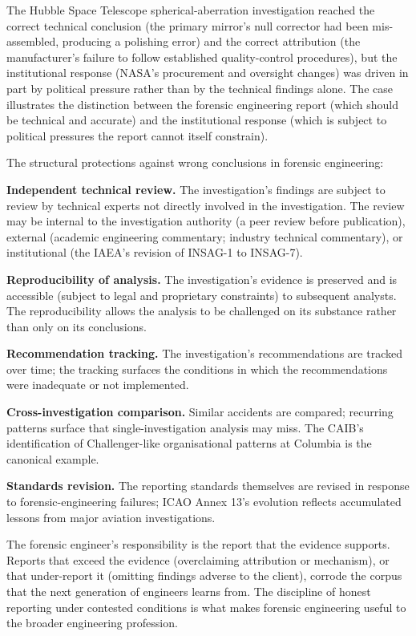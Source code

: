 The Hubble Space Telescope spherical-aberration investigation \cite{acc:nasa-hubble-optical-systems-1990} reached the correct technical conclusion (the primary mirror's null corrector had been mis-assembled, producing a polishing error) and the correct attribution (the manufacturer's failure to follow established quality-control procedures), but the institutional response (NASA's procurement and oversight changes) was driven in part by political pressure rather than by the technical findings alone. The case illustrates the distinction between the forensic engineering report (which should be technical and accurate) and the institutional response (which is subject to political pressures the report cannot itself constrain).

The structural protections against wrong conclusions in forensic engineering:

\textbf{Independent technical review.} The investigation's findings are subject to review by technical experts not directly involved in the investigation. The review may be internal to the investigation authority (a peer review before publication), external (academic engineering commentary; industry technical commentary), or institutional (the IAEA's revision of INSAG-1 to INSAG-7).

\textbf{Reproducibility of analysis.} The investigation's evidence is preserved and is accessible (subject to legal and proprietary constraints) to subsequent analysts. The reproducibility allows the analysis to be challenged on its substance rather than only on its conclusions.

\textbf{Recommendation tracking.} The investigation's recommendations are tracked over time; the tracking surfaces the conditions in which the recommendations were inadequate or not implemented.

\textbf{Cross-investigation comparison.} Similar accidents are compared; recurring patterns surface that single-investigation analysis may miss. The CAIB's identification of Challenger-like organisational patterns at Columbia \cite{acc:caib-columbia} is the canonical example.

\textbf{Standards revision.} The reporting standards themselves are revised in response to forensic-engineering failures; ICAO Annex 13's evolution reflects accumulated lessons from major aviation investigations.

\begin{principle}
The forensic engineer's responsibility is the report that the evidence supports. Reports that exceed the evidence (overclaiming attribution or mechanism), or that under-report it (omitting findings adverse to the client), corrode the corpus that the next generation of engineers learns from. The discipline of honest reporting under contested conditions is what makes forensic engineering useful to the broader engineering profession.
\end{principle}


